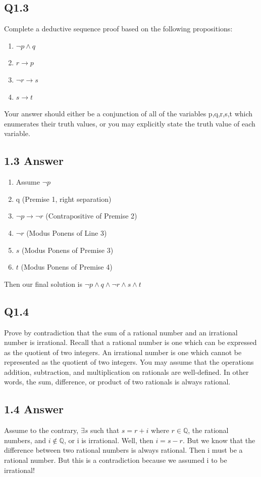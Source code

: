 \documentclass{article}
\begin{document}
\subsection*{Q1.3}
Complete a deductive sequence proof based on the following propositions:
\begin{enumerate}
    \item $\lnot p \land q$
    \item $r \rightarrow p$
    \item $\lnot r \rightarrow s$
    \item $s \rightarrow t$
\end{enumerate}
Your answer should either be a conjunction of all of the variables p,q,r,s,t which enumerates their
truth values, or you may explicitly state the truth value of each variable.
\newpage
\subsection*{1.3 Answer}
\begin{enumerate}
    \item Assume $\lnot p$
    \item q (Premise 1, right separation)
    \item $\lnot p \rightarrow \lnot r$ (Contrapositive of Premise 2)
    \item $\lnot r$ (Modus Ponens of Line 3)
    \item $s$ (Modus Ponens of Premise 3)
    \item $t$ (Modus Ponens of Premise 4)
\end{enumerate}
Then our final solution is $\lnot p \land q \land \lnot r \land s \land t$
\newpage
\subsection*{Q1.4}
Prove by contradiction that the sum of a rational number and an irrational number is irrational. Recall that a rational number is one
which can be expressed as the quotient of two integers. An irrational number is one which cannot be represented as the quotient of two integers.
You may assume that the operations addition, subtraction, and multiplication on rationals are well-defined. In other words, the sum, difference, or
product of two rationals is always rational.
\newpage
\subsection*{1.4 Answer}
Assume to the contrary, $\exists s$ such that $s = r + i$ where $r \in \mathbb{Q}$, the rational numbers, and $i \notin \mathbb{Q}$, or i is irrational.
Well, then $i = s - r$. But we know that the difference between two rational numbers is always rational. Then i must be a rational number. But this is a contradiction
because we assumed i to be irrational! 
\newpage
\end{document}
